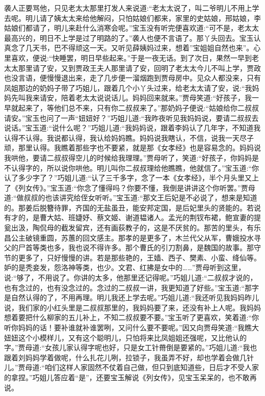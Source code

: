 \begin{parag}
    袭人正要骂他，只见老太太那里打发人来说道:“老太太说了，叫二爷明儿不用上学去呢。明儿请了姨太太来给他解闷，只怕姑娘们都来，家里的史姑娘，邢姑娘，李姑娘们都请了，明儿来赴什么消寒会呢。”宝玉没有听完便喜欢道:“可不是，老太太最高兴的，明日不上学是过了明路的了。”袭人也便不言语了。那丫头回去。宝玉认真念了几天书，巴不得顽这一天。又听见薛姨妈过来，想着”宝姐姐自然也来”。心里喜欢，便说:“快睡罢，明日早些起来。”于是一夜无话。到了次日，果然一早到老太太那里请了安，又到贾政王夫人那里请了安，回明了老太太今儿不叫上学，贾政也没言语，便慢慢退出来，走了几步便一溜烟跑到贾母房中。见众人都没来，只有凤姐那边的奶妈子带了巧姐儿，跟着几个小丫头过来，给老太太请了安，说:“我妈妈先叫我来请安，陪着老太太说说话儿。妈妈回来就来。”贾母笑道:“好孩子，我一早就起来了，等他们总不来，只有你二叔叔来了。”那奶妈子便说:“姑娘给你二叔叔请安。”宝玉也问了一声“妞妞好？”巧姐儿道:“我昨夜听见我妈妈说，要请二叔叔去说话。”宝玉道:“说什么呢？”巧姐儿道:“我妈妈说，跟着李妈认了几年字，不知道我认得不认得。我说都认得，我认给妈妈瞧。妈妈说我瞎认，不信，说我一天尽子顽，那里认得。我瞧着那些字也不要紧，就是那《女孝经》也是容易念的。妈妈说我哄他，要请二叔叔得空儿的时候给我理理。”贾母听了，笑道:“好孩子，你妈妈是不认得字的，所以说你哄他。明儿叫你二叔叔理给他瞧瞧，他就信了。”宝玉道:“你认了多少字了？”巧姐儿道:“认了三千多字，念了一本《女孝经》，半个月头里又上了《列女传》。”宝玉道:“你念了懂得吗？你要不懂，我倒是讲讲这个你听罢。”贾母道:“做叔叔的也该讲究给侄女听听。”宝玉道:“那文王后妃是不必说了，想来是知道的。那姜后脱簪待罪，齐国的无盐虽丑，能安邦定国，是后妃里头的贤能的。若说有才的，是曹大姑、班婕妤、蔡文姬、谢道韫诸人。孟光的荆钗布裙，鲍宣妻的提瓮出汲，陶侃母的截发留宾，还有画荻教子的，这是不厌贫的。那苦的里头，有乐昌公主破镜重圆，苏蕙的回文感主。那孝的是更多了，木兰代父从军，曹娥投水寻父的尸首等类也多，我也说不得许多。那个曹氏的引刀割鼻，是魏国的故事。那守节的更多了，只好慢慢的讲。若是那些艳的，王嫱、西子、樊素、小蛮、绛仙等。妒的是秃妾发，怨洛神等类，也少。文君、红拂是女中的……”贾母听到这里，说:“够了，不用说了。你讲的太多，他那里还记得呢。”巧姐儿道:“二叔叔才说的，也有念过的，也有没念过的。念过的二叔叔一讲，我更知道了好些。”宝玉道:“那字是自然认得的了，不用再理。明儿我还上学去呢。”巧姐儿道:“我还听见我妈妈昨儿说，我们家的小红头里是二叔叔那里的，我妈妈要了来，还没有补上人呢。我妈妈想着要把什么柳家的五儿补上，不知二叔叔要不要。”宝玉听了更喜欢，笑着道:“你听你妈妈的话！要补谁就补谁罢咧，又问什么要不要呢。”因又向贾母笑道:“我瞧大妞妞这个小模样儿，又有这个聪明儿，只怕将来比凤姐姐还强呢，又比他认的字。”贾母道:“女孩儿家认得字呢也好，只是女工针黹倒是要紧的。”巧姐儿道:“我也跟着刘妈妈学着做呢，什么扎花儿咧，拉锁子，我虽弄不好，却也学着会做几针儿。”贾母道:“咱们这样人家固然不仗着自己做，但只到底知道些，日后才不受人家的拿捏。”巧姐儿答应着“是”，还要宝玉解说《列女传》，见宝玉呆呆的，也不敢再说。
\end{parag}


